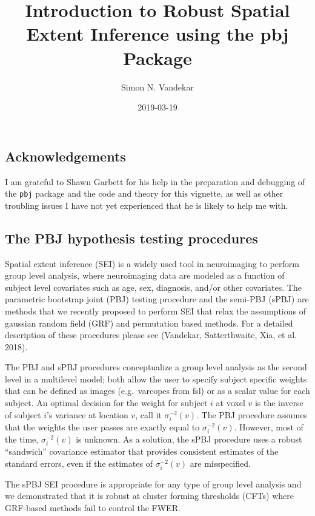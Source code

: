 \documentclass[]{article}
\title{Introduction to Robust Spatial Extent Inference using the pbj Package}
\author{Simon N. Vandekar}
\date{2019-03-19}
\begin{document}
\maketitle

\subsection{Acknowledgements}\label{acknowledgements}

I am grateful to Shawn Garbett for his help in the preparation and
debugging of the \texttt{pbj} package and the code and theory for this
vignette, as well as other troubling issues I have not yet experienced
that he is likely to help me with.

\subsection{The PBJ hypothesis testing
procedures}\label{the-pbj-hypothesis-testing-procedures}

Spatial extent inference (SEI) is a widely used tool in neuroimaging to
perform group level analysis, where neuroimaging data are modeled as a
function of subject level covariates such as age, sex, diagnosis, and/or
other covariates. The parametric bootstrap joint (PBJ) testing procedure
and the semi-PBJ (sPBJ) are methods that we recently proposed to perform
SEI that relax the assumptions of gaussian random field (GRF) and
permutation based methods. For a detailed description of these
procedures please see (Vandekar, Satterthwaite, Xia, et al. 2018).

The PBJ and sPBJ procedures conceptualize a group level analysis as the
second level in a multilevel model; both allow the user to specify
subject specific weights that can be defined as images (e.g.~varcopes
from fsl) or as a scalar value for each subject. An optimal decision for
the weight for subject \(i\) at voxel \(v\) is the inverse of subject
\(i\)'s variance at location \(v\), call it \(\sigma^{-2}_i(v)\). The
PBJ procedure assumes that the weights the user passes are exactly equal
to \(\sigma^{-2}_i(v)\). However, most of the time, \(\sigma^{-2}_i(v)\)
is unknown. As a solution, the sPBJ procedure uses a robust ``sandwich''
covariance estimator that provides consistent estimates of the standard
errors, even if the estimates of \(\sigma^{-2}_i(v)\) are misspecified.

The sPBJ SEI procedure is appropriate for any type of group level
analysis and we demonstrated that it is robust at cluster forming
thresholds (CFTs) where GRF-based methods fail to control the FWER.
\end{document}
